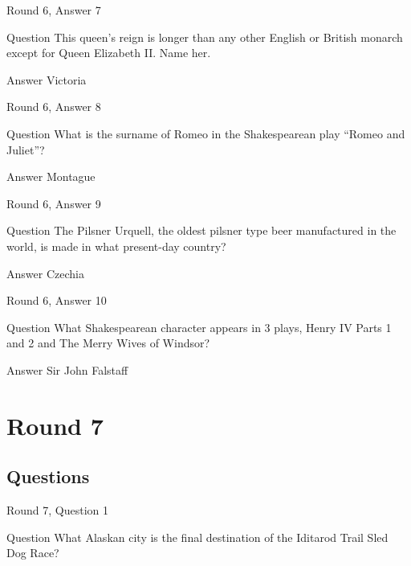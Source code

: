 \documentclass[11pt]{beamer}
\begin{document}
\begin{frame}{Round 6, Answer 7}
\begin{block}{Question}
This queen's reign is longer than any other English or British monarch except for Queen Elizabeth II. Name her.
\end{block}
\pause{}
\begin{block}{Answer}
Victoria
\end{block}
\end{frame}
    

\begin{frame}{Round 6, Answer 8}
\begin{block}{Question}
What is the surname of Romeo in the Shakespearean play ``Romeo and Juliet''\@?
\end{block}
\pause{}
\begin{block}{Answer}
Montague
\end{block}
\end{frame}
    

\begin{frame}{Round 6, Answer 9}
\begin{block}{Question}
The Pilsner Urquell, the oldest pilsner type beer manufactured in the world, is made in what present-day country\@?
\end{block}
\pause{}
\begin{block}{Answer}
Czechia
\end{block}
\end{frame}
    

\begin{frame}{Round 6, Answer 10}
\begin{block}{Question}
What Shakespearean character appears in 3 plays, Henry IV Parts 1 and 2 and The Merry Wives of Windsor\@?
\end{block}
\pause{}
\begin{block}{Answer}
Sir John Falstaff
\end{block}
\end{frame}
    

\section{Round 7}
    
\subsection{Questions}

\begin{frame}{Round 7, Question 1}
\begin{block}{Question}
What Alaskan city is the final destination of the Iditarod Trail Sled Dog Race\@?
\end{block}
\end{frame}
    
\end{document}
